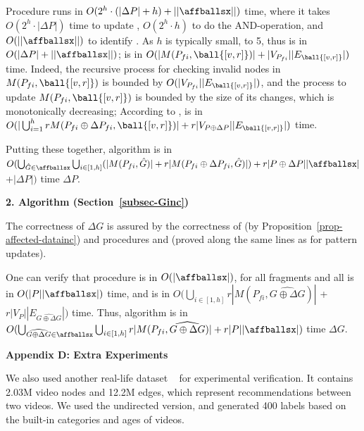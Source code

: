 \vspace{-1ex}
Procedure \identifyaffball runs in $O(2^{h}\cdot(|\Delta P|+h) +||\affballsx||)$ time, where it takes $O(2^{h}\cdot|\Delta P|)$ time to update \bfc, $O(2^{h}\cdot h)$ to do the AND-operation, and $O(||\affballsx||)$ to identify \affballsx.
As $h$ is typically small,  to 5, thus \identifyaffball is in $O(|\Delta P|+||\affballsx||)$;
\patedgeinsert is in $O(|M(P_{fi}, \ball{[v,r]})|+|V_{P_{fi}}||E_{\ball{[v,r]}}|)$ time.
Indeed, the recursive process for checking invalid nodes in $M(P_{fi}, \ball{[v,r]})$ is bounded by $O(|V_{P_{fi}}||E_{\ball{[v,r]}}|)$,
and the process to update $M(P_{fi}, \ball{[v,r]})$ is bounded by the size of its changes, which is monotonically decreasing;
According to \patedgeinsert,
\comb is in $O(|\bigcup^{h}_{i=1} rM(P_{fi}\oplus\Delta P_{fi},\ball{[v,r]})|+r|V_{P\oplus \Delta P}||E_{\ball{[v,r]}}|)$ time.

\vspace{-1ex}
Putting these together, algorithm \incp is in
$O(\bigcup_{\hat{G}\in \affballsx}\bigcup_{i\in[1,h]}(|M(P_{fi}, \hat{G})|+r|M(P_{fi} \oplus \Delta P_{fi}, \hat{G})|) + r|P \oplus \Delta P||\affballsx|$ +$|\Delta P|)$ time \wrt $\Delta P$.


\noindent
{\textbf{2. Algorithm \incd (Section~\ref{subsec-Ginc})}}

The correctness of \incd \wrt $\Delta G$ is assured by the correctness of
\identifyaffball (by Proposition~\ref{prop-affected-datainc}) and procedures \incmatch and \comb (proved along the same lines as for pattern updates).

\vspace{-1ex}
One can verify that procedure \identifyaffball is in $O(|\affballsx|)$,
\incmatch for all fragments and all \affballsx is in $O(|P||\affballsx|)$ time, and \comb is in $O(\bigcup_{i\in[1,h]}r|M(P_{fi}, \widehat{G\oplus\Delta G})|$ + $r|V_{P}||E_{\widehat{G\oplus\Delta G}}|)$ time.
Thus, algorithm \incd is in
$O(\bigcup_{\widehat{G\oplus\Delta G}\in \affballsx} \bigcup_{i\in[1,h]}r|M(P_{fi}, \widehat{G\oplus\Delta G})|+r|P||\affballsx|)$ time \wrt $\Delta G$.

\vspace{1ex}
\noindent
{\large \textbf{Appendix D: Extra Experiments}}
\label{sec-apd-exp}

\vspace{-0.5ex}

We also used another real-life dataset {\em \youtube}~\cite{youtubeWeb} for experimental verification.
It contains 2.03M video nodes and 12.2M edges, which represent recommendations between two videos. We used the undirected version, and generated 400 labels based on the built-in categories and ages of videos.

